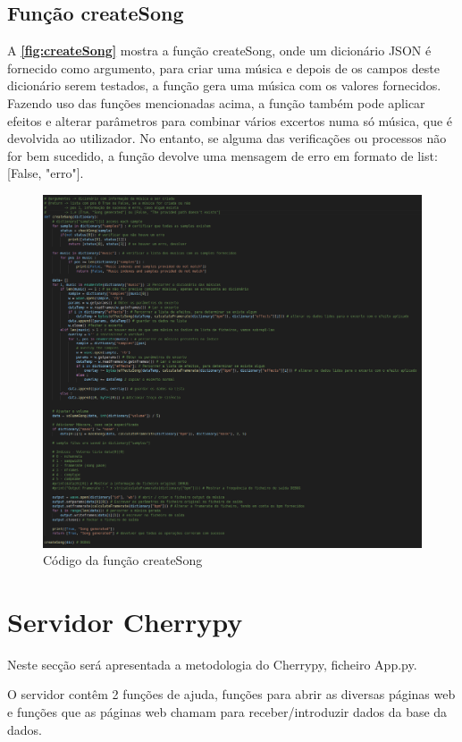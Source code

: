 \documentclass{report}
\begin{document}
\subsection{Função createSong}
\label{ssec:createSong}
A \textbf{\autoref{fig:createSong}} mostra a função createSong, onde um dicionário JSON é fornecido como argumento, para criar
uma música e depois de os campos deste dicionário serem testados, a função gera uma música com os valores fornecidos. Fazendo 
uso das funções mencionadas acima, a função também pode aplicar efeitos e alterar parâmetros para combinar vários excertos
numa só música, que é devolvida ao utilizador. No entanto, se alguma das verificações ou processos não for bem sucedido, a
função devolve uma mensagem de erro em formato de list: [False, "erro"].

\begin{figure}[!h]
\center 
\includegraphics[width=330pt]{img/createSong.png}
\caption{Código da função createSong}
\label{fig:createSong}
\end{figure}
    

\section{Servidor Cherrypy}
\label{sec:serCherrypy}
Neste secção será apresentada a metodologia do Cherrypy, ficheiro App.py.

O servidor contêm 2 funções de ajuda, funções para abrir as diversas páginas web e funções que as páginas web chamam para receber/introduzir dados da base da dados.
\end{document}
